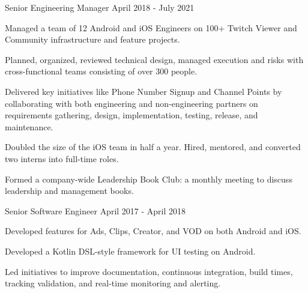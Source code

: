 \begin{cventries}
  \cventry
    {Senior Engineering Manager} %
    {} %
    {} %
    {April 2018 - July 2021} %
    {
	\begin{cvitems} %
	\item Managed a team of 12 Android and iOS Engineers on 100+ Twitch Viewer and Community infrastructure and feature projects.
	\item Planned, organized, reviewed technical design, managed execution and risks with cross-functional teams consisting of over 300 people.
	\item Delivered key initiatives like Phone Number Signup and Channel Points by collaborating with both engineering and non-engineering partners on requirements gathering, design, implementation, testing, release, and maintenance.
	\item Doubled the size of the iOS team in half a year. Hired, mentored, and converted two interns into full-time roles.
	\item Formed a company-wide Leadership Book Club: a monthly meeting to discuss leadership and management books.
	\end{cvitems}
    }
    
  \cventry
    {Senior Software Engineer} %
    {} %
    {} %
    {April 2017 - April 2018} %
    {
	\begin{cvitems} %
      	\item Developed features for Ads, Clips, Creator, and VOD on both Android and iOS.
      	\item Developed a Kotlin DSL-style framework for UI testing on Android. 
      	\item Led initiatives to improve documentation, continuous integration, build times, tracking validation, and real-time monitoring and alerting.
	\end{cvitems}
    }


\end{cventries}
